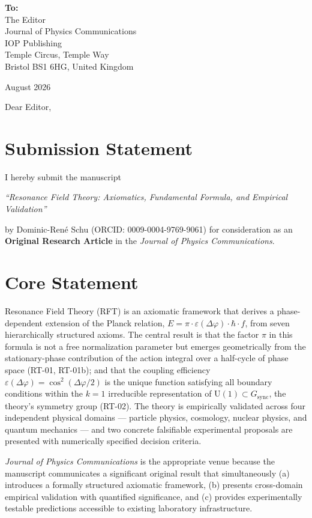 \documentclass[12pt]{article}
\begin{document}
\noindent
\textbf{To:}\\
The Editor\\
Journal of Physics Communications\\
IOP Publishing\\
Temple Circus, Temple Way\\
Bristol BS1 6HG, United Kingdom

\bigskip
\noindent August 2026

\bigskip
Dear Editor,

\section*{Submission Statement}

I hereby submit the manuscript

\begin{center}
\textit{``Resonance Field Theory: Axiomatics, Fundamental Formula, and Empirical Validation''}
\end{center}

\noindent by Dominic-Ren\'e Schu (ORCID: 0009-0004-9769-9061) for consideration as an
\textbf{Original Research Article} in the \textit{Journal of Physics Communications}.

\section*{Core Statement}

Resonance Field Theory (RFT) is an axiomatic framework that derives a phase-dependent
extension of the Planck relation,
$E = \pi \cdot \varepsilon(\Delta\varphi) \cdot \hbar \cdot f$,
from seven hierarchically structured axioms. The central result is that the factor $\pi$
in this formula is not a free normalization parameter but emerges geometrically from the
stationary-phase contribution of the action integral over a half-cycle of phase space
(RT-01, RT-01b); and that the coupling efficiency
$\varepsilon(\Delta\varphi) = \cos^2(\Delta\varphi/2)$ is the unique function satisfying
all boundary conditions within the $k\!=\!1$ irreducible representation of
$\mathrm{U}(1) \subset G_{\mathrm{sync}}$, the theory's symmetry group (RT-02). The
theory is empirically validated across four independent physical domains --- particle
physics, cosmology, nuclear physics, and quantum mechanics --- and two concrete
falsifiable experimental proposals are presented with numerically specified decision
criteria.

\textit{Journal of Physics Communications} is the appropriate venue because the
manuscript communicates a significant original result that simultaneously (a) introduces
a formally structured axiomatic framework, (b) presents cross-domain empirical
validation with quantified significance, and (c) provides experimentally testable
predictions accessible to existing laboratory infrastructure.
\end{document}
